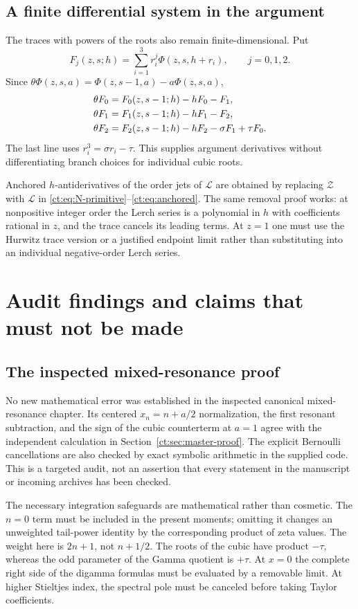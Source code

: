 \documentclass[11pt]{article}
\numberwithin{equation}{section}
\theoremstyle{definition}\newtheorem{definition}[theorem]{Definition}
\theoremstyle{remark}\newtheorem{remark}[theorem]{Remark}
\newcommand{\Ztr}{\mathcal Z}
\newcommand{\Ltr}{\mathcal L}
\begin{document}
\subsection{A finite differential system in the argument}
The traces with powers of the roots also remain finite-dimensional. Put
\[
 F_j(z,s;h)=\sum_{i=1}^3r_i^j\Phi(z,s,h+r_i),\qquad j=0,1,2.
\]
Since $\theta\Phi(z,s,a)=\Phi(z,s-1,a)-a\Phi(z,s,a)$,
\begin{align}
 \theta F_0&=F_0(z,s-1;h)-hF_0-F_1,\notag\\
 \theta F_1&=F_1(z,s-1;h)-hF_1-F_2,\label{ct:eq:lerch-system}\\
 \theta F_2&=F_2(z,s-1;h)-hF_2-\sigma F_1+\tau F_0.\notag
\end{align}
The last line uses $r_i^3=\sigma r_i-\tau$.
This supplies argument derivatives without differentiating branch choices
for individual cubic roots.

Anchored $h$-antiderivatives of the order jets of $\Ltr$ are obtained by
replacing $\Ztr$ with $\Ltr$ in \eqref{ct:eq:N-primitive}--\eqref{ct:eq:anchored}.
The same removal proof works: at nonpositive integer order the Lerch series
is a polynomial in $h$ with coefficients rational in $z$, and the trace
cancels its leading terms. At $z=1$ one must use the Hurwitz trace version
or a justified endpoint limit rather than substituting into an individual
negative-order Lerch series.

\section{Audit findings and claims that must not be made}
\label{ct:sec:audit}
\subsection{The inspected mixed-resonance proof}
No new mathematical error was established in the inspected canonical
mixed-resonance chapter. Its centered $x_n=n+a/2$ normalization, the first
resonant subtraction, and the sign of the cubic counterterm at $a=1$ agree with
the independent calculation in Section~\ref{ct:sec:master-proof}.
The explicit Bernoulli cancellations are also checked by exact symbolic
arithmetic in the supplied code. This is a targeted audit, not an assertion
that every statement in the manuscript or incoming archives has been checked.

The necessary integration safeguards are mathematical rather than cosmetic.
The $n=0$ term must be included in the present moments; omitting it changes
an unweighted tail-power identity by the corresponding product of zeta
values. The weight here is $2n+1$, not $n+1/2$. The roots of the cubic have
product $-\tau$, whereas the odd parameter of the Gamma quotient is $+\tau$.
At $x=0$ the complete right side of the digamma formulas must be evaluated
by a removable limit. At higher Stieltjes index, the spectral pole must be
canceled before taking Taylor coefficients.
\end{document}
